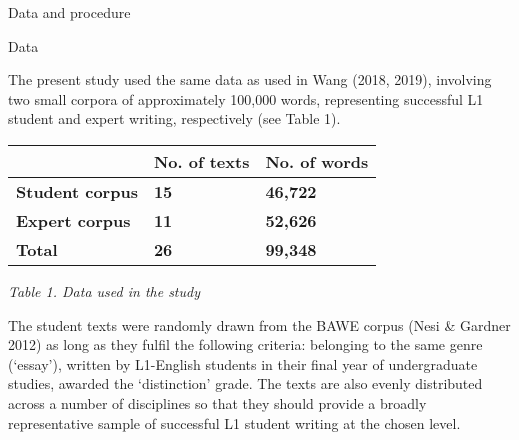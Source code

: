 \begin{listWWNumxivleveli}
\item 
\begin{stylelsSectioni}
Data and procedure
\end{stylelsSectioni}

\begin{listWWNumxivlevelii}
\item 
\begin{stylelsSectionii}
Data
\end{stylelsSectionii}
\end{listWWNumxivlevelii}
\end{listWWNumxivleveli}
\begin{styleStandard}
The present study used the same data as used in Wang (2018, 2019), involving two small corpora of approximately 100,000 words, representing successful L1 student and expert writing, respectively (see Table 1). 
\end{styleStandard}

\begin{center}
\tablefirsthead{}
\tablehead{}
\tabletail{}
\tablelasttail{}
\begin{supertabular}{m{1.1775599in}m{0.90595984in}m{1.0038599in}}
\hline
 &
{\bfseries No. of texts} &
{\bfseries No. of words}\\\hline
{\bfseries Student corpus} &
{\bfseries \textmd{15}} &
{\bfseries \textmd{46,722}}\\
{\bfseries Expert corpus} &
{\bfseries \textmd{11}} &
{\bfseries \textmd{52,626}}\\
{\bfseries Total} &
{\bfseries \textmd{26}} &
{\bfseries \textmd{99,348}}\\\hline
\end{supertabular}
\end{center}
\begin{styleStandard}
\textit{Table 1. Data used in the study}
\end{styleStandard}

\begin{styleStandard}
The student texts were randomly drawn from the BAWE corpus (Nesi \& Gardner 2012) as long as they fulfil the following criteria: belonging to the same genre (‘essay’), written by L1-English students in their final year of undergraduate studies, awarded the ‘distinction’ grade. The texts are also evenly distributed across a number of disciplines so that they should provide a broadly representative sample of successful L1 student writing at the chosen level. 
\end{styleStandard}

